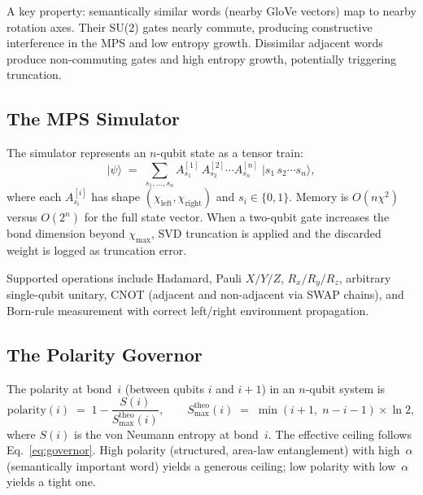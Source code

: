 \documentclass{article}
\begin{document}
A key property: semantically similar words (nearby GloVe vectors) map to nearby rotation axes.  Their SU(2) gates nearly commute, producing constructive interference in the MPS and low entropy growth.  Dissimilar adjacent words produce non-commuting gates and high entropy growth, potentially triggering truncation.

\subsection{The MPS Simulator}

The simulator represents an $n$-qubit state as a tensor train:
\begin{equation}
  \lvert\psi\rangle
  \;=\;
  \sum_{s_{1},\dots,s_{n}}
  A^{[1]}_{s_{1}}\,A^{[2]}_{s_{2}}\cdots A^{[n]}_{s_{n}}\;
  \lvert s_{1}\,s_{2}\cdots s_{n}\rangle,
\end{equation}
where each $A^{[i]}_{s_{i}}$ has shape $(\chi_{\mathrm{left}},\chi_{\mathrm{right}})$ and $s_{i}\in\{0,1\}$.  Memory is $O(n\chi^{2})$ versus $O(2^{n})$ for the full state vector.  When a two-qubit gate increases the bond dimension beyond $\chi_{\max}$, SVD truncation is applied and the discarded weight is logged as truncation error.

Supported operations include Hadamard, Pauli $X/Y/Z$, $R_{x}/R_{y}/R_{z}$, arbitrary single-qubit unitary, CNOT (adjacent and non-adjacent via SWAP chains), and Born-rule measurement with correct left/right environment propagation.

\subsection{The Polarity Governor}

The polarity at bond~$i$ (between qubits $i$ and $i\!+\!1$) in an $n$-qubit system is
\begin{equation}
  \mathrm{polarity}(i)
  \;=\;
  1 - \frac{S(i)}{S_{\max}^{\mathrm{theo}}(i)},
  \qquad
  S_{\max}^{\mathrm{theo}}(i)
  \;=\;
  \min(i+1,\;n-i-1)\times\ln 2,
\end{equation}
where $S(i)$ is the von Neumann entropy at bond~$i$.  The effective ceiling follows Eq.~\eqref{eq:governor}.  High polarity (structured, area-law entanglement) with high~$\alpha$ (semantically important word) yields a generous ceiling; low polarity with low~$\alpha$ yields a tight one.
\end{document}
